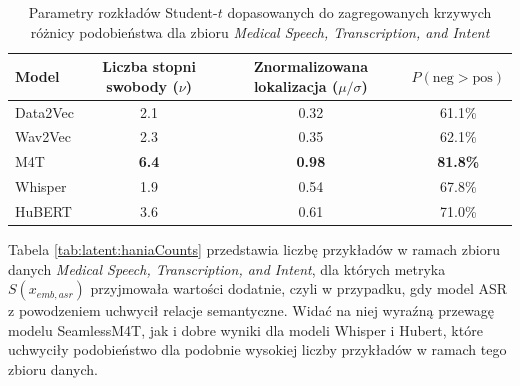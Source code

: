 \begin{table}[!ht]
\centering
\begin{tabular}{lccc}
\hline
Model & Liczba stopni swobody ($\nu$) & Znormalizowana lokalizacja ($\mu/\sigma$) & $P(\text{neg} > \text{pos})$ \\
\hline
Data2Vec  & 2.1 & 0.32 & 61.1\% \\
Wav2Vec   & 2.3 & 0.35 & 62.1\% \\
M4T    & \textbf{6.4} & \textbf{0.98} & \textbf{81.8\%} \\
Whisper   & 1.9 & 0.54 & 67.8\% \\
HuBERT    & 3.6 & 0.61 & 71.0\% \\
\hline
\end{tabular}
\caption{Parametry rozkładów Student-$t$ dopasowanych do zagregowanych krzywych różnicy podobieństwa dla zbioru \textit{Medical Speech, Transcription, and Intent}}
\label{tab:latent:haniaDist}
\end{table}

Tabela \ref{tab:latent:haniaCounts} przedstawia liczbę przykładów w ramach zbioru danych \textit{Medical Speech, Transcription, and Intent}, dla których metryka $S(x_{emb,asr})$ przyjmowała wartości dodatnie, czyli w przypadku, gdy model ASR z powodzeniem uchwycił relacje semantyczne. Widać na niej wyraźną przewagę modelu SeamlessM4T, jak i dobre wyniki dla modeli Whisper i Hubert, które uchwyciły podobieństwo dla podobnie wysokiej liczby przykładów w ramach tego zbioru danych.

